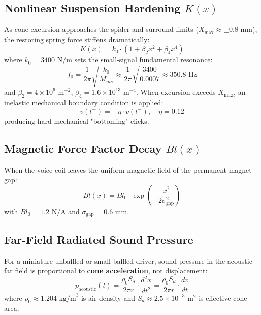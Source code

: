 \documentclass[11pt,a4paper]{article}
\begin{document}
\subsection{Nonlinear Suspension Hardening $K(x)$}
As cone excursion approaches the spider and surround limits ($X_{\max} \approx \pm 0.8\text{ mm}$), the restoring spring force stiffens dramatically:
\begin{equation}
K(x) = k_0 \cdot \left( 1 + \beta_2 x^2 + \beta_4 x^4 \right)
\end{equation}
where $k_0 = 3400\text{ N/m}$ sets the small-signal fundamental resonance:
\begin{equation}
f_0 = \frac{1}{2\pi} \sqrt{\frac{k_0}{M_{ms}}} \approx \frac{1}{2\pi} \sqrt{\frac{3400}{0.0007}} \approx 350.8\text{ Hz}
\end{equation}
and $\beta_2 = 4 \times 10^6\text{ m}^{-2}$, $\beta_4 = 1.6 \times 10^{13}\text{ m}^{-4}$. When excursion exceeds $X_{\max}$, an inelastic mechanical boundary condition is applied:
\begin{equation}
v(t^+) = -\eta \cdot v(t^-), \quad \eta = 0.12
\end{equation}
producing hard mechanical "bottoming" clicks.

\subsection{Magnetic Force Factor Decay $Bl(x)$}
When the voice coil leaves the uniform magnetic field of the permanent magnet gap:
\begin{equation}
Bl(x) = Bl_0 \cdot \exp\left( -\frac{x^2}{2 \sigma_{\text{gap}}^2} \right)
\end{equation}
with $Bl_0 = 1.2\text{ N/A}$ and $\sigma_{\text{gap}} = 0.6\text{ mm}$.

\subsection{Far-Field Radiated Sound Pressure}
For a miniature unbaffled or small-baffled driver, sound pressure in the acoustic far field is proportional to \textbf{cone acceleration}, not displacement:
\begin{equation}
p_{\text{acoustic}}(t) = \frac{\rho_0 S_d}{2 \pi r} \cdot \frac{d^2 x}{dt^2} = \frac{\rho_0 S_d}{2 \pi r} \cdot \frac{dv}{dt}
\end{equation}
where $\rho_0 \approx 1.204\text{ kg/m}^3$ is air density and $S_d \approx 2.5 \times 10^{-3}\text{ m}^2$ is effective cone area.
\end{document}
